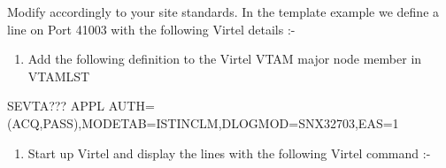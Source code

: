\documentclass[letterpaper,10pt,english]{sphinxmanual}
\begin{document}
Modify accordingly to your site standards. In the template example we define a line on Port 41003 with the following Virtel details :-

\begin{sphinxVerbatim}[commandchars=\\\{\}]
             
            
     
   
       
        
                
\end{sphinxVerbatim}
\begin{enumerate}
\def\theenumi{\arabic{enumi}}
\def\labelenumi{\theenumi .}
\makeatletter\def\p@enumii{\p@enumi \theenumi .}\makeatother
\setcounter{enumi}{1}
\item {} 
Add the following definition to the Virtel VTAM major node member in VTAMLST

\end{enumerate}

\begin{sphinxVerbatim}[commandchars=\\\{\}]
SEVTA??? APPL  AUTH=(ACQ,PASS),MODETAB=ISTINCLM,DLOGMOD=SNX32703,EAS=1
\end{sphinxVerbatim}
\begin{enumerate}
\def\theenumi{\arabic{enumi}}
\def\labelenumi{\theenumi .}
\makeatletter\def\p@enumii{\p@enumi \theenumi .}\makeatother
\setcounter{enumi}{2}
\item {} 
Start up Virtel and display the lines with the following Virtel command :-

\end{enumerate}

\begin{sphinxVerbatim}[commandchars=\\\{\}]
 
\end{sphinxVerbatim}
\end{document}

